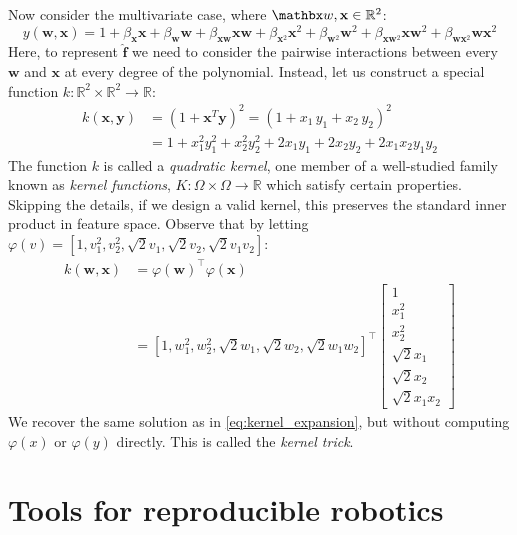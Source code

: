 %
Now consider the multivariate case, where $\mathbx w, \mathbf x \in \mathbb R^2$:
%
\begin{equation}
    y(\mathbf w, \mathbf x) = 1 + \beta_{\mathbf x} \mathbf x + \beta_{\mathbf w}\mathbf w + \beta_{\mathbf x\mathbf w} \mathbf x\mathbf w + \beta_{\mathbf x^2} \mathbf x^2 + \beta_{\mathbf w^2} \mathbf w^2 + \beta_{\mathbf x\mathbf w^2} \mathbf x\mathbf w^2 + \beta_{\mathbf w\mathbf x^2} \mathbf w\mathbf x^2
\end{equation}
%
Here, to represent $\mathbf{\hat f}$ we need to consider the pairwise interactions between every $\mathbf w$ and $\mathbf x$ at every degree of the polynomial. Instead, let us construct a special function $k: \mathbb R^2 \times \mathbb R^2 \rightarrow \mathbb R$:
%
\begin{align}\label{eq:kernel_expansion}
    k(\mathbf x, \mathbf y) & = (1 + \mathbf x^T \mathbf y)^2 = (1 + x_1 \, y_1 + x_2 \, y_2)^2 \\
    & = 1 + x_1^2 y_1^2 + x_2^2 y_2^2 + 2 x_1 y_1 + 2 x_2 y_2 + 2 x_1 x_2 y_1 y_2
\end{align}
%
The function $k$ is called a \textit{quadratic kernel}, one member of a well-studied family known as \textit{kernel functions}, $K: \Omega \times \Omega \rightarrow \mathbb R$ which satisfy certain properties. Skipping the details, if we design a valid kernel, this preserves the standard inner product in feature space. Observe that by letting $\varphi(v) = \left[1, v_1^2, v_2^2, \sqrt{2} v_1, \sqrt{2} v_2, \sqrt{2} v_1 v_2\right]$:
%
\begin{align}
    k(\mathbf w, \mathbf x) &= \varphi(\mathbf w)^\intercal \varphi(\mathbf x) \\
    &=[1, w_1^2, w_2^2, \sqrt{2} w_1, \sqrt{2} w_2, \sqrt{2} w_1 w_2]^\intercal\begin{bmatrix}
                                                                                   1\\ x_1^2\\ x_2^2\\ \sqrt{2} x_1\\ \sqrt{2} x_2\\ \sqrt{2} x_1 x_2
    \end{bmatrix}
\end{align}
%
We recover the same solution as in \autoref{eq:kernel_expansion}, but without computing $\varphi(x)$ or $\varphi(y)$ directly. This is called the \textit{kernel trick}.

\chapter{Tools for reproducible robotics}

